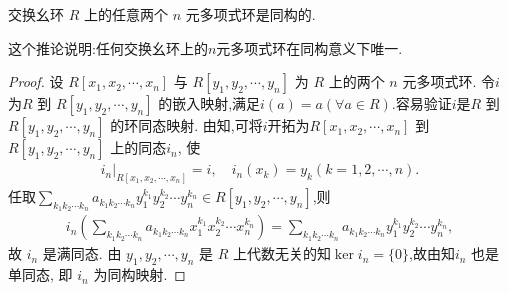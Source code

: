 \documentclass[../../main.tex]{subfiles}%
\begin{document}
\begin{corollary}
交换幺环 \( R \) 上的任意两个 \( n \) 元多项式环是同构的.
\end{corollary}
\begin{note}
这个推论说明:任何交换幺环上的$n$元多项式环在同构意义下唯一.
\end{note}
\begin{proof}

设 \( R[x_1, x_2, \cdots, x_n] \) 与 \( R[y_1, y_2, \cdots, y_n] \) 为 \( R \) 上的两个 \( n \) 元多项式环. 令$i$为\( R \) 到 \( R[y_1, y_2, \cdots, y_n] \) 的嵌入映射,满足\( i(a) = a (\forall a \in R) \).容易验证$i$是\( R \) 到 \( R[y_1, y_2, \cdots, y_n] \) 的环同态映射.
由知,可将$i$开拓为\( R[x_1, x_2, \cdots, x_n] \) 到 \( R[y_1, y_2, \cdots, y_n] \) 上的同态\( i_n \), 使 
\begin{align*}
i_n|_{R[x_1, x_2, \cdots, x_n]} = i ,\quad i_n(x_k) = y_k (k = 1, 2, \cdots, n).
\end{align*}
任取$\sum_{k_1 k_2 \cdots k_n} a_{k_1 k_2 \cdots k_n} y_1^{k_1} y_2^{k_2} \cdots y_n^{k_n} \in  R[y_1, y_2, \cdots, y_n]$,则
\begin{align*}
i_n \left( \sum_{k_1 k_2 \cdots k_n} a_{k_1 k_2 \cdots k_n} x_1^{k_1} x_2^{k_2} \cdots x_n^{k_n} \right) = \sum_{k_1 k_2 \cdots k_n} a_{k_1 k_2 \cdots k_n} y_1^{k_1} y_2^{k_2} \cdots y_n^{k_n},
\end{align*}
故 \( i_n \) 是满同态. 由 \( y_1, y_2, \cdots, y_n \) 是 \( R \) 上代数无关的知$\ker i_n=\{0\}$,故由知\( i_n \) 也是单同态, 即 \( i_n \) 为同构映射.

\end{proof}
\end{document}
